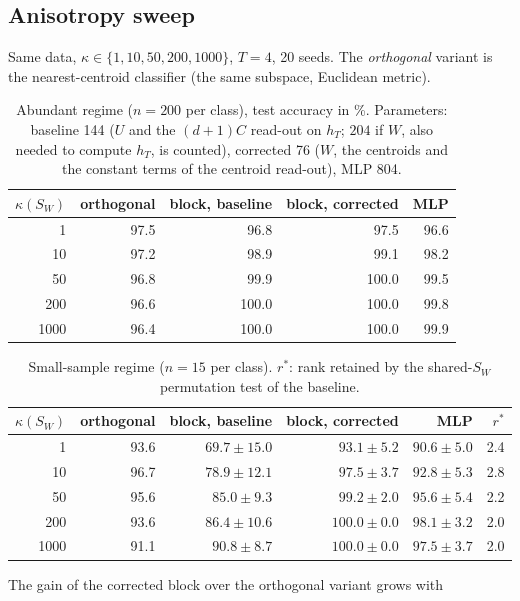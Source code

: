 \documentclass[11pt,a4paper]{article}
\theoremstyle{plain}
\theoremstyle{definition}
\theoremstyle{remark}
\begin{document}
\subsection{Anisotropy sweep}
Same data, $\kappa\in\{1,10,50,200,1000\}$, $T=4$, 20 seeds. The
\emph{orthogonal} variant is the nearest-centroid classifier (the same
subspace, Euclidean metric).
\begin{table}[h]
\centering\small\renewcommand{\arraystretch}{1.12}
\caption{Abundant regime ($n=200$ per class), test accuracy in \%. Parameters: baseline 144 ($U$ and the $(d+1)C$ read-out on $h_T$; $204$ if $W$, also needed to compute $h_T$, is counted), corrected 76 ($W$, the centroids and the constant terms of the centroid read-out), MLP 804.}
\label{tab:ample}
\begin{tabular}{@{}rrrrr@{}}
\toprule
$\kappa(S_W)$ & orthogonal & block, baseline & block, corrected & MLP \\
\midrule
1 & 97.5 & 96.8 & 97.5 & 96.6 \\
10 & 97.2 & 98.9 & 99.1 & 98.2 \\
50 & 96.8 & 99.9 & 100.0 & 99.5 \\
200 & 96.6 & 100.0 & 100.0 & 99.8 \\
1000 & 96.4 & 100.0 & 100.0 & 99.9 \\
\bottomrule
\end{tabular}
\end{table}
\begin{table}[h]
\centering\small\renewcommand{\arraystretch}{1.12}
\caption{Small-sample regime ($n=15$ per class). $r^\ast$: rank retained by the shared-$S_W$ permutation test of the baseline.}
\label{tab:scarce}
\begin{tabular}{@{}rrrrrr@{}}
\toprule
$\kappa(S_W)$ & orthogonal & block, baseline & block, corrected & MLP & $r^\ast$ \\
\midrule
1 & 93.6 & $69.7\pm15.0$ & $93.1\pm5.2$ & $90.6\pm5.0$ & 2.4 \\
10 & 96.7 & $78.9\pm12.1$ & $97.5\pm3.7$ & $92.8\pm5.3$ & 2.8 \\
50 & 95.6 & $85.0\pm9.3$ & $99.2\pm2.0$ & $95.6\pm5.4$ & 2.2 \\
200 & 93.6 & $86.4\pm10.6$ & $100.0\pm0.0$ & $98.1\pm3.2$ & 2.0 \\
1000 & 91.1 & $90.8\pm8.7$ & $100.0\pm0.0$ & $97.5\pm3.7$ & 2.0 \\
\bottomrule
\end{tabular}
\end{table}
The gain of the corrected block over the orthogonal variant grows with
\end{document}
